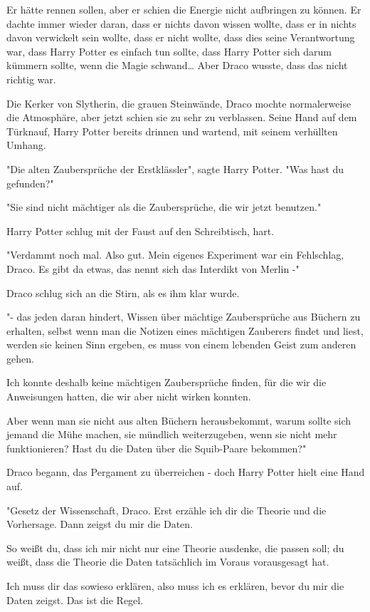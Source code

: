{Er hätte rennen sollen, aber er schien die Energie nicht aufbringen zu können. Er dachte immer wieder daran, dass er nichts davon wissen wollte, dass er in nichts davon verwickelt sein wollte, dass er nicht wollte, dass dies seine Verantwortung war, dass Harry Potter es einfach tun sollte, dass Harry Potter sich darum kümmern sollte, wenn die Magie schwand… Aber Draco wusste, dass das nicht richtig war.

Die Kerker von Slytherin, die grauen Steinwände, Draco mochte normalerweise die Atmosphäre, aber jetzt schien sie zu sehr zu verblassen. Seine Hand auf dem Türknauf, Harry Potter bereits drinnen und wartend, mit seinem verhüllten Umhang.

"Die alten Zaubersprüche der Erstklässler", sagte Harry Potter. "Was hast du gefunden?"

"Sie sind nicht mächtiger als die Zaubersprüche, die wir jetzt benutzen."

Harry Potter schlug mit der Faust auf den Schreibtisch, hart.

"Verdammt noch mal. Also gut. Mein eigenes Experiment war ein Fehlschlag, Draco. Es gibt da etwas, das nennt sich das Interdikt von Merlin -"

Draco schlug sich an die Stirn, als es ihm klar wurde.

"- das jeden daran hindert, Wissen über mächtige Zaubersprüche aus Büchern zu erhalten, selbst wenn man die Notizen eines mächtigen Zauberers findet und liest, werden sie keinen Sinn ergeben, es muss von einem lebenden Geist zum anderen gehen.

Ich konnte deshalb keine mächtigen Zaubersprüche finden, für die wir die Anweisungen hatten, die wir aber nicht wirken konnten.

Aber wenn man sie nicht aus alten Büchern herausbekommt, warum sollte sich jemand die Mühe machen, sie mündlich weiterzugeben, wenn sie nicht mehr funktionieren? Hast du die Daten über die Squib-Paare bekommen?"

Draco begann, das Pergament zu überreichen - doch Harry Potter hielt eine Hand auf.

"Gesetz der Wissenschaft, Draco. Erst erzähle ich dir die Theorie und die Vorhersage. Dann zeigst du mir die Daten.

So weißt du, dass ich mir nicht nur eine Theorie ausdenke, die passen soll; du weißt, dass die Theorie die Daten tatsächlich im Voraus vorausgesagt hat.

Ich muss dir das sowieso erklären, also muss ich es erklären, bevor du mir die Daten zeigst. Das ist die Regel.

}
